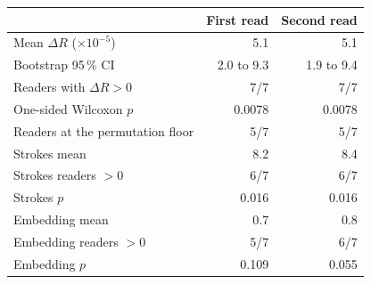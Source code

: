 \begin{tabular}{lrr}
\toprule
 & First read & Second read \\
\midrule
Mean $\Delta R$ ($\times10^{-5}$) & 5.1 & 5.1 \\
Bootstrap 95\,\% CI & 2.0 to 9.3 & 1.9 to 9.4 \\
Readers with $\Delta R > 0$ & 7/7 & 7/7 \\
One-sided Wilcoxon $p$ & 0.0078 & 0.0078 \\
Readers at the permutation floor & 5/7 & 5/7 \\
Strokes mean & 8.2 & 8.4 \\
Strokes readers $> 0$ & 6/7 & 6/7 \\
Strokes $p$ & 0.016 & 0.016 \\
Embedding mean & 0.7 & 0.8 \\
Embedding readers $> 0$ & 5/7 & 6/7 \\
Embedding $p$ & 0.109 & 0.055 \\
\bottomrule
\end{tabular}
